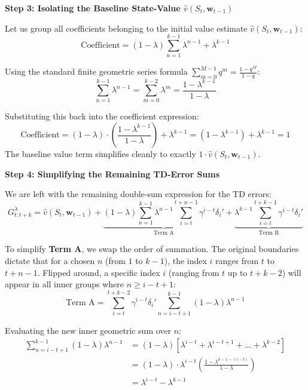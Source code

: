 \documentclass{article}
\begin{document}
\textbf{Step 3: Isolating the Baseline State-Value $\hat{v}(S_t, \mathbf{w}_{t-1})$}

Let us group all coefficients belonging to the initial value estimate $\hat{v}(S_t, \mathbf{w}_{t-1})$:
\begin{equation}
\text{Coefficient} = (1-\lambda) \sum_{n=1}^{k-1} \lambda^{n-1} + \lambda^{k-1}
\end{equation}

Using the standard finite geometric series formula $\sum_{m=0}^{M-1} q^m = \frac{1-q^M}{1-q}$:
\begin{equation}
\sum_{n=1}^{k-1} \lambda^{n-1} = \sum_{m=0}^{k-2} \lambda^m = \frac{1-\lambda^{k-1}}{1-\lambda}
\end{equation}

Substituting this back into the coefficient expression:
\begin{equation}
\text{Coefficient} = (1-\lambda) \cdot \left( \frac{1-\lambda^{k-1}}{1-\lambda} \right) + \lambda^{k-1} = (1 - \lambda^{k-1}) + \lambda^{k-1} = 1
\end{equation}
The baseline value term simplifies cleanly to exactly $1 \cdot \hat{v}(S_t, \mathbf{w}_{t-1})$.

\textbf{Step 4: Simplifying the Remaining TD-Error Sums}

We are left with the remaining double-sum expression for the TD errors:
\begin{equation}
G_{t:t+k}^\lambda = \hat{v}(S_t, \mathbf{w}_{t-1}) + \underbrace{(1-\lambda) \sum_{n=1}^{k-1} \lambda^{n-1} \sum_{i=t}^{t+n-1} \gamma^{i-t} \delta_i'}_{\text{Term A}} + \underbrace{\lambda^{k-1} \sum_{i=t}^{t+k-1} \gamma^{i-t} \delta_i'}_{\text{Term B}}
\end{equation}

To simplify \textbf{Term A}, we swap the order of summation. The original boundaries dictate that for a chosen $n$ (from $1$ to $k-1$), the index $i$ ranges from $t$ to $t+n-1$. Flipped around, a specific index $i$ (ranging from $t$ up to $t+k-2$) will appear in all inner groups where $n \geq i - t + 1$:
\begin{equation}
\text{Term A} = \sum_{i=t}^{t+k-2} \gamma^{i-t} \delta_i' \sum_{n=i-t+1}^{k-1} (1-\lambda) \lambda^{n-1}
\end{equation}

Evaluating the new inner geometric sum over $n$:
\begin{align*}
\sum_{n=i-t+1}^{k-1} (1-\lambda) \lambda^{n-1} &= (1-\lambda) \left[ \lambda^{i-t} + \lambda^{i-t+1} + \dots + \lambda^{k-2} \right] \\
&= (1-\lambda) \cdot \lambda^{i-t} \left( \frac{1-\lambda^{k-1-(i-t)}}{1-\lambda} \right) \\
&= \lambda^{i-t} - \lambda^{k-1}
\end{align*}
\end{document}
